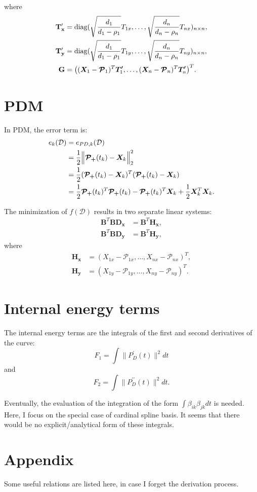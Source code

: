 \documentclass[11pt]{article}
\DeclarePairedDelimiter{\diagfences}{(}{)}
\newcommand{\diag}{\operatorname{diag}\diagfences}
\newcommand{\sd}{\mathcal{D}} %
\newcommand{\bmmpp}{\bm{\mathcal{P_+}}} %
\newcommand{\half}{\frac{1}{2}}
\newcommand{\vX}[1]{\bm{X}_{#1}} %
\newcommand{\vTp}[1]{\bm{T^{\prime}}_{#1}} %
\newcommand{\vP}[1]{\bm{\mathcal{P}}_{#1}} %
\newcommand{\sP}[1]{\mathcal{P}_{#1}} %
\newcommand{\mB}{\mathbf{B}} %
\newcommand{\mG}{\mathbf{G}} %
\newcommand{\mTpx}{\mathbf{T^{\prime}_x}} %
\newcommand{\mTpy}{\mathbf{T^{\prime}_y}} %
\newcommand{\mDx}{\mathbf{D_x}} %
\newcommand{\mDy}{\mathbf{D_y}} %
\newcommand{\mHx}{\mathbf{H_x}} %
\newcommand{\mHy}{\mathbf{H_y}} %
\renewcommand{\b}[1]{\beta_{#1}}
\begin{document}
where
\[
\begin{split}
\mTpx &=
\diag{\sqrt{\frac{d_1}{d_1-\rho_1}}T_{1x},\dots,\sqrt{\frac{d_n}{d_n-\rho_n}}T_{nx}}_{n\times n},\\
\mTpy &=
\diag{\sqrt{\frac{d_1}{d_1-\rho_1}}T_{1y},\dots,\sqrt{\frac{d_n}{d_n-\rho_n}}T_{ny}}_{n\times n},\\
\mG &= \bigl((\vX{1}-\vP{1})^T\vTp{1},\dots,(\vX{n}-\vP{n})^T\vTp{n}\bigr)^T.
\end{split}
\]

\section{PDM}
In PDM, the error term is:
\[
\begin{split}
e_k(\sd) &= e_{PD,k}(\sd) \\
&= \half\Bigl\Vert{\bmmpp(t_k)-\vX{k}}\Bigr\Vert_2^2 \\
&= \half(\bmmpp(t_k)-\vX{k})^T(\bmmpp(t_k)-\vX{k}) \\
&= \half\bmmpp(t_k)^T\bmmpp(t_k)-\bmmpp(t_k)^T\vX{k}+\half\vX{k}^T\vX{k}.
\end{split}
\]

The minimization of $f(\sd)$ results in two separate linear systems:
\[
\begin{split}
\mB^T\mB\mDx &= \mB^T\mHx,\\
\mB^T\mB\mDy &= \mB^T\mHy,
\end{split}
\]
where
\[
\begin{split}
\mHx &= (X_{1x}-\sP{1x},\dots,X_{nx}-\sP{nx})^T,\\
\mHy &= (X_{1y}-\sP{1y},\dots,X_{ny}-\sP{ny})^T.
\end{split}
\]

\section{Internal energy terms}
The internal energy terms are the integrals of the first and second derivatives of the curve:
\[
F_1 = \int {\|P^\prime_D(t)\|^2 }dt
\]
and
\[
F_2 = \int{\|P^{\prime\prime}_D(t)\|^2}dt .
\]

Eventually, the evaluation of the integration of the form $\int{\b{ik}\b{jk}}dt$ is needed. Here, I focus on the special case of cardinal spline basis. It seems that there would be no explicit/analytical form of these integrals.


\section{Appendix}
Some useful relations are listed here, in case I forget the derivation process.
\end{document}
